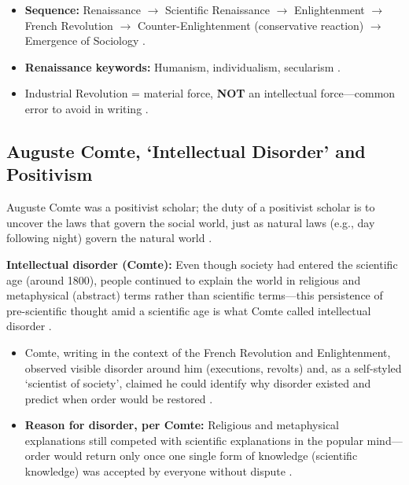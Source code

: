 \begin{QuickRevision}
\begin{itemize}
    \item \textbf{Sequence:} Renaissance $\rightarrow$ Scientific Renaissance $\rightarrow$ Enlightenment $\rightarrow$ French Revolution $\rightarrow$ Counter-Enlightenment (conservative reaction) $\rightarrow$ Emergence of Sociology .
    \item \textbf{Renaissance keywords:} Humanism, individualism, secularism .
    \item Industrial Revolution = material force, \textbf{NOT} an intellectual force---common error to avoid in writing .
\end{itemize}
\end{QuickRevision}

\subsection{Auguste Comte, `Intellectual Disorder' and Positivism}
Auguste Comte was a positivist scholar; the duty of a positivist scholar is to uncover the laws that govern the social world, just as natural laws (e.g., day following night) govern the natural world .

\begin{KeyConcept}
\textbf{Intellectual disorder (Comte):} Even though society had entered the scientific age (around 1800), people continued to explain the world in religious and metaphysical (abstract) terms rather than scientific terms---this persistence of pre-scientific thought amid a scientific age is what Comte called intellectual disorder .
\begin{itemize}
    \item Comte, writing in the context of the French Revolution and Enlightenment, observed visible disorder around him (executions, revolts) and, as a self-styled `scientist of society', claimed he could identify why disorder existed and predict when order would be restored .
    \item \textbf{Reason for disorder, per Comte:} Religious and metaphysical explanations still competed with scientific explanations in the popular mind---order would return only once one single form of knowledge (scientific knowledge) was accepted by everyone without dispute .
\end{itemize}
\end{KeyConcept}

